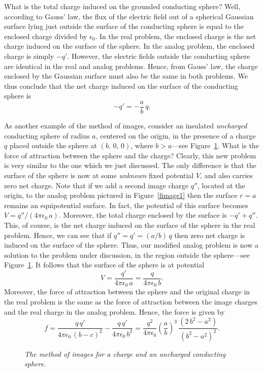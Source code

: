 What is the total charge induced on the grounded conducting sphere? Well, according to
Gauss' law, the flux of the electric field out of a spherical Gaussian surface lying just
outside the surface of the conducting sphere is equal to the enclosed charge divided
by $\epsilon_0$. In the real problem, the enclosed charge is the net
charge induced on the surface of the sphere. In the analog problem, the
enclosed charge is simply $-q'$. However, the electric fields outside the
conducting sphere are identical in the real and analog problems. Hence, from Gauss'
law, the charge enclosed by the Gaussian surface must also be the same in both problems.
We thus conclude that the net charge induced on the surface of the conducting sphere is
\begin{equation}
-q' =-\frac{a}{b}\,q.
\end{equation}


As another example of the method of images, consider an insulated {\em uncharged}\/
conducting sphere of radius $a$, centered on the origin, in the presence of
a charge $q$ placed outside the sphere at $(b,\,0,\, 0)$, where $b>a$---see Figure~\ref{fimage2}. What is the force of attraction between the sphere
and the charge? Clearly, this new problem is  very similar to the one which we just discussed. The only difference is that the surface of
the sphere is now at some  {\em unknown}\/ fixed potential $V$, and also carries zero net charge. Note that if we add a second image charge $q''$, located at the
origin, to the analog problem pictured in Figure~\ref{fimage1} then the surface $r=a$ remains an equipotential surface. In fact, the potential of this surface becomes $V=q''/(4\pi\epsilon_0\,a)$. Moreover, the total charge enclosed
by the surface is $-q'+q''$. This, of course, is the net charge induced on the
surface of the sphere in the real problem. Hence, we can see that if $q''=q'=(a/b)\,q$ then zero net charge is induced on the surface of the sphere. Thus, our
modified analog problem is now a solution to the  problem under discussion, in the region outside the
sphere---see Figure~\ref{fimage2}. It follows that the surface of the sphere is at potential
\begin{equation}
V = \frac{q'}{4\pi\epsilon_0\,a} = \frac{q}{4\pi\epsilon_0\,b}.
\end{equation}
Moreover, the force of attraction between the sphere and the original charge
in the real problem
is the same as the force of attraction between the image charges and the
real  charge in the analog problem. Hence, the force is given by
\begin{equation}
f = \frac{q\,q'}{4\pi\epsilon_0\,(b-c)^2} - \frac{q\,q'}{4\pi\epsilon_0\,b^2}
= \frac{q^2}{4\pi\epsilon_0}\left(\frac{a}{b}\right)^3\,\frac{(2\,b^2-a^2)}{(b^2-a^2)^2}.
\end{equation} 
\begin{figure}
\epsfysize=2.25in
\centerline{}
\caption{\em The method of images for a charge and an uncharged conducting sphere.}\label{fimage2}
\end{figure}


